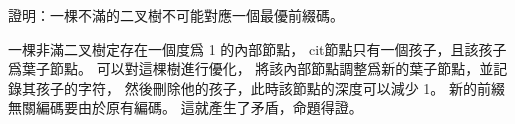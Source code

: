 \startEXERCISE
證明：一棵不滿的二叉樹不可能對應一個最優前綴碼。
\stopEXERCISE

\startANSWER
一棵非滿二叉樹定存在一個度爲 1 的內部節點，
cit節點只有一個孩子，且該孩子爲葉子節點。
可以對這棵樹進行優化，
將該內部節點調整爲新的葉子節點，並記錄其孩子的字符，
然後刪除他的孩子，此時該節點的深度可以減少 1。
新的前綴無關編碼要由於原有編碼。
這就產生了矛盾，命題得證。
\stopANSWER
